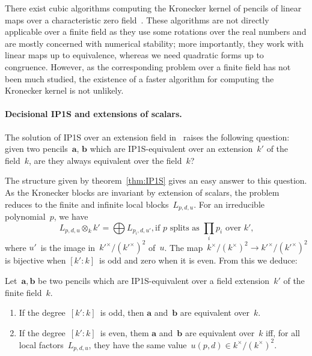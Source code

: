 \documentclass{lms}%
\begin{document}
There exist cubic algorithms computing the Kronecker kernel of pencils of
linear maps over a characteristic zero field~\cite{beelen1988improved}.
These algorithms are not directly applicable over a finite field as they
use some rotations over the real numbers and are mostly concerned with
numerical stability; more importantly, they work with linear maps up to
equivalence, whereas we need quadratic forms up to congruence. However, as the
corresponding problem over a finite field has not been much studied, the
existence of a faster algorithm for computing the Kronecker kernel is not
unlikely.

\paragraph{Decisional IP1S and extensions of scalars.}

The solution of IP1S over an extension field
in~\cite{DBLP:journals/corr/BerthomieuFP13} raises the following
question: given two pencils~$\bm{a}$, $\bm{b}$ which are IP1S-equivalent
over an extension~$k'$ of the field~$k$, are they always equivalent over
the field~$k$?

The structure given by theorem~\ref{thm:IP1S} gives an easy answer
to this question. As the Kronecker blocks are invariant by extension of
scalars, the problem reduces to the finite and infinite local
blocks~$L_{p,d,u}$. For an irreducible polynomial~$p$, we have
\begin{equation}\label{local-extension}
L_{p,d,u} ⊗_{k} k' = %
⨁ L_{p_i,d,u'}, %
\text{if $p$~splits as~$∏_ip_i$ over~$k'$,}
\end{equation}
where $u'$~is the image in~$k'^{×}/(k'^{×})^2$ of~$u$. The
map~$k^{×}/(k^{×})^2 → k'^{×}/(k'^{×})^2$ is bijective when $[k':k]$~is
odd and zero when it is even. From this we deduce:

\begin{prop}\label{prop:IP1S-extension}
Let~$\bm{a}, \bm{b}$ be two pencils which are IP1S-equivalent over a
field extension~$k'$ of the finite field~$k$.
\begin{enumerate}
\item If the degree~$[k':k]$~is odd, then $\bm{a}$ and~$\bm{b}$ are
equivalent over~$k$.
\item If the degree~$[k':k]$~is even, them $\bm{a}$ and~$\bm{b}$ are
equivalent over~$k$ iff, for all local factors~$L_{p,d,u}$, they have the
same value~$u(p,d) ∈ k^{×}/(k^{×})^2$.
\end{enumerate}
\end{prop}
\end{document}
